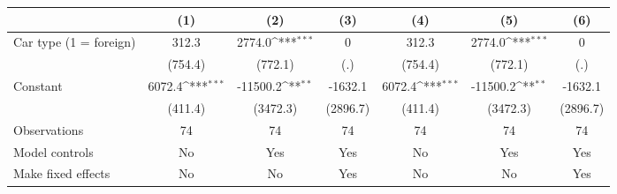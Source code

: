 {
\def\sym#1{\ifmmode^{#1}\else\(^{#1}\)\fi}
\begin{tabular}{l*{6}{c}}
\hline\hline
                &\multicolumn{1}{c}{(1)}         &\multicolumn{1}{c}{(2)}         &\multicolumn{1}{c}{(3)}         &\multicolumn{1}{c}{(4)}         &\multicolumn{1}{c}{(5)}         &\multicolumn{1}{c}{(6)}         \\
\hline
Car type (1 = foreign)&    312.3         &   2774.0\sym{***}&        0         &    312.3         &   2774.0\sym{***}&        0         \\
                &  (754.4)         &  (772.1)         &      (.)         &  (754.4)         &  (772.1)         &      (.)         \\
[1em]
Constant        &   6072.4\sym{***}& -11500.2\sym{**} &  -1632.1         &   6072.4\sym{***}& -11500.2\sym{**} &  -1632.1         \\
                &  (411.4)         & (3472.3)         & (2896.7)         &  (411.4)         & (3472.3)         & (2896.7)         \\
\hline
Observations    &       74         &       74         &       74         &       74         &       74         &       74         \\
Model controls  &       No         &      Yes         &      Yes         &       No         &      Yes         &      Yes         \\
Make fixed effects&       No         &       No         &      Yes         &       No         &       No         &      Yes         \\
\hline\hline \end{tabular}} \begin{tablenotes} \footnotesize \item \lipsum[1] \end{tablenotes}
